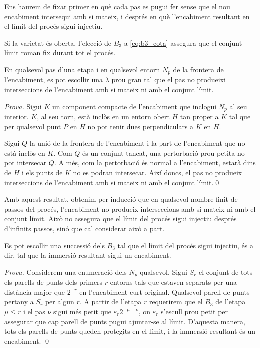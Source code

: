 Ens haurem de fixar primer en què cada pas es pugui fer sense que el nou encabiment intersequi amb si mateix, i després en què l'encabiment resultant en el límit del procés sigui injectiu.
\begin{obs}
    Si la varietat és oberta, l'elecció de $B_3$ a \eqref{eq:b3_cota} assegura que el conjunt límit roman fix durant tot el procés.
\end{obs}
\begin{prop}
    En qualsevol pas d'una etapa i en qualsevol entorn $N_p$ de la frontera de l'encabiment, es pot escollir una $\lambda$ prou gran tal que el pas no produeixi interseccions de l'encabiment amb si mateix ni amb el conjunt límit.
\end{prop}
{
\color{green!50!black} \textit{Prova.} 
    Sigui $K$ un component compacte de l'encabiment que inclogui $N_p$ al seu interior. $K$, al seu torn, està inclòs en un entorn obert $H$ tan proper a $K$ tal que per qualsevol punt $P$ en $H$ no pot tenir dues perpendiculars a $K$ en $H$.

    Sigui $Q$ la unió de la frontera de l'encabiment i la part de l'encabiment que no està inclòs en $K$. Com $Q$ és un conjunt tancat, una pertorbació prou petita no pot intersecar $Q$. A més, com la pertorbació és normal a l'encabiment, estarà dins de $H$ i els punts de $K$ no es podran intersecar. Així doncs, el pas no produeix interseccions de l'encabiment amb si mateix ni amb el conjunt límit.\qed
}

Amb aquest resultat, obtenim per inducció que en qualsevol nombre finit de passos del procés, l'encabiment no produeix interseccions amb si mateix ni amb el conjunt límit. Això no assegura que el límit del procés sigui injectiu després d'infinits passos, sinó que cal considerar això a part.

\begin{prop}
    Es pot escollir una successió dels $B_3$ tal que el límit del procés sigui injectiu, és a dir, tal que la immersió resultant sigui un encabiment.
\end{prop}
{
\color{green!50!black} \textit{Prova.} 
    Considerem una enumeració dels $N_p$ qualsevol. Sigui $S_r$ el conjunt de tots els parells de punts dels primers $r$ entorns tals que estaven separats per una distància major que $2^{-r}$ en l'encabiment curt original. Qualsevol parell de punts pertany a $S_r$ per algun $r$. A partir de l'etapa $r$ requerirem que el $B_3$ de l'etapa $\mu\le r$ i el pas $\nu$ sigui més petit que $\varepsilon_r2^{-\mu-\nu}$, on $\varepsilon_r$ s'escull prou petit per assegurar que cap parell de punts pugui ajuntar-se al límit. D'aquesta manera, tots els parells de punts queden protegits en el límit, i la immersió resultant és un encabiment. \qed
}
